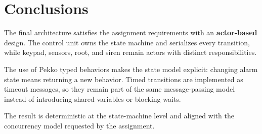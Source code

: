 \section{Conclusions}

The final architecture satisfies the assignment requirements with an \textbf{actor-based} design.
The control unit owns the state machine and serializes every transition, while keypad, sensors, root, and siren remain
actors with distinct responsibilities.

The use of Pekko typed behaviors makes the state model explicit: changing alarm state means returning a new behavior.
Timed transitions are implemented as timeout messages, so they remain part of the same message-passing model instead of
introducing shared variables or blocking waits.

The result is deterministic at the state-machine level and aligned with the concurrency model requested by the
assignment.
